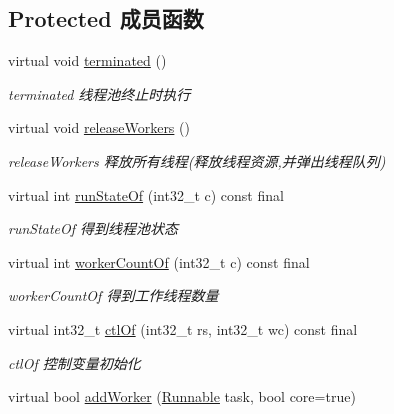 \subsection*{Protected 成员函数}
\begin{DoxyCompactItemize}
\item 
\mbox{\label{classThreadPoolExecutor_a61774315237123faf8e7fcc9d35ae47d}} 
virtual void \hyperlink{classThreadPoolExecutor_a61774315237123faf8e7fcc9d35ae47d}{terminated} ()
\begin{DoxyCompactList}\small\item\em terminated 线程池终止时执行 \end{DoxyCompactList}\item 
\mbox{\label{classThreadPoolExecutor_a7d4bfa422c41a11fcdd33e7a1b2bcec8}} 
virtual void \hyperlink{classThreadPoolExecutor_a7d4bfa422c41a11fcdd33e7a1b2bcec8}{release\+Workers} ()
\begin{DoxyCompactList}\small\item\em release\+Workers 释放所有线程(释放线程资源,并弹出线程队列) \end{DoxyCompactList}\item 
virtual int \hyperlink{classThreadPoolExecutor_acdb626fdcb6ed4c7822508d1e0a3fcf5}{run\+State\+Of} (int32\+\_\+t c) const final
\begin{DoxyCompactList}\small\item\em run\+State\+Of 得到线程池状态 \end{DoxyCompactList}\item 
virtual int \hyperlink{classThreadPoolExecutor_a4f842d070a584bbc16a693207a947aac}{worker\+Count\+Of} (int32\+\_\+t c) const final
\begin{DoxyCompactList}\small\item\em worker\+Count\+Of 得到工作线程数量 \end{DoxyCompactList}\item 
virtual int32\+\_\+t \hyperlink{classThreadPoolExecutor_a31ed7a73571c79c8dbb486f27a4df4eb}{ctl\+Of} (int32\+\_\+t rs, int32\+\_\+t wc) const final
\begin{DoxyCompactList}\small\item\em ctl\+Of 控制变量初始化 \end{DoxyCompactList}\item 
virtual bool \hyperlink{classThreadPoolExecutor_aa4eb0971fc6f352df594186b6a118d6c}{add\+Worker} (\hyperlink{classRunnable}{Runnable} task, bool core=true)

\end{DoxyCompactItemize}
